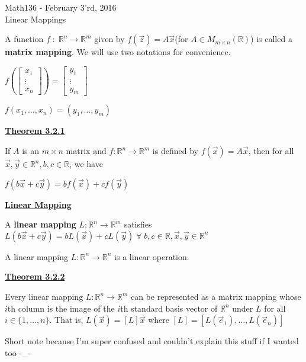 \documentclass{letter}
\newcommand{\0}[1]{\begin{bmatrix}#1\end{bmatrix}}
\newcommand{\h}[1]{\underline{\textbf{#1}}}
\begin{document}
	\begin{center}
		\LARGE Math136 - February 3'rd, 2016\\
		\large Linear Mappings
	\end{center}
	\vspace{0.25 in}
	
	A function $f\;:\;\mathbb{R}^n \to \mathbb{R}^m$ given by $f(\vec z) = A\vec x$(for $A \in M_{m\times n} (\mathbb{R})$) is called a \textbf{matrix mapping}. We will use two notations for convenience.
	
	$f(\0{x_1\\\vdots\\x_n}) = \0{y_1\\\vdots\\y_m}$
	
	$f(x_1, \dots, x_n) = (y_1, \dots, y_m)$
	
	\h{Theorem 3.2.1}
	
	If $A$ is an $m \times n$ matrix and $f : \mathbb{R}^n \to \mathbb{R}^m$ is defined by $f(\vec x) = A\vec x$, then for all $\vec x, \vec y \in \mathbb{R}^n, b, c \in \mathbb{R}$, we have
	
	$f(b\vec x + c\vec y) = bf(\vec x) + cf(\vec y)$
	
	\h{Linear Mapping}
	
	A \textbf{linear mapping} $L : \mathbb{R}^n \to \mathbb{R}^m$ satisfies $L(b \vec x + c\vec y) = bL(\vec x) + cL(\vec y)\;\forall\;b, c \in \mathbb{R}, \vec x, \vec y \in \mathbb{R}^n$
	
	A linear mapping $L : \mathbb{R}^n \to \mathbb{R}^n$ is a linear operation.
	
	\h{Theorem 3.2.2}
	
	Every linear mapping $L : \mathbb{R}^n \to \mathbb{R}^m$ can be represented as a matrix mapping whose $i$th column is the image of the $i$th standard basis vector of $\mathbb{R}^n$ under $L$ for all $i \in \{ 1, \dots, n \}$. That is, $L(\vec x) = \left[ L \right] \vec x$ where $\left[ L \right] = \left[ L(\vec e_1), \dots, L(\vec e_n)\right]$
	
	Short note because I'm super confused and couldn't explain this stuff if I wanted too -\_-
\end{document}
